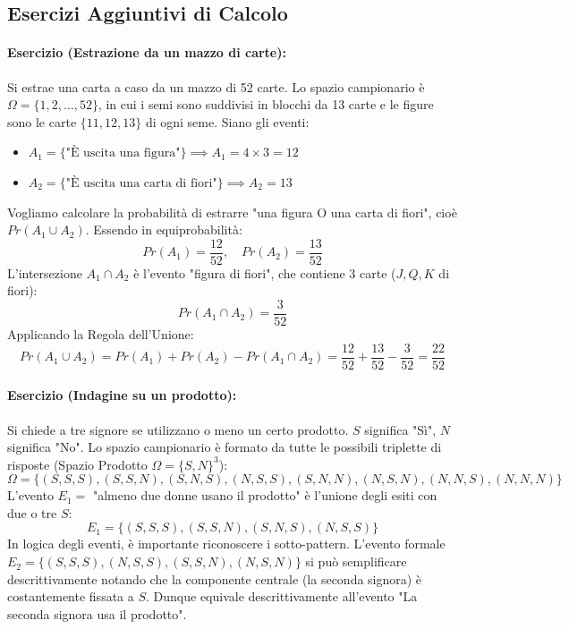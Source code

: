 \documentclass[12pt, a4paper]{article}
\begin{document}
\subsection{Esercizi Aggiuntivi di Calcolo}

\paragraph{Esercizio (Estrazione da un mazzo di carte):}
Si estrae una carta a caso da un mazzo di 52 carte. Lo spazio campionario è $\Omega = \{1, 2, \dots, 52\}$, in cui i semi sono suddivisi in blocchi da 13 carte e le figure sono le carte $\{11, 12, 13\}$ di ogni seme.
Siano gli eventi:
\begin{itemize}
    \item $A_1 = \{\text{"È uscita una figura"}\} \implies A_1 = 4 \times 3 = 12$
    \item $A_2 = \{\text{"È uscita una carta di fiori"}\} \implies A_2 = 13$
\end{itemize}
Vogliamo calcolare la probabilità di estrarre "una figura O una carta di fiori", cioè $Pr(A_1 \cup A_2)$.
Essendo in equiprobabilità:
$$ Pr(A_1) = \frac{12}{52}, \quad Pr(A_2) = \frac{13}{52} $$
L'intersezione $A_1 \cap A_2$ è l'evento "figura di fiori", che contiene 3 carte ($J, Q, K$ di fiori):
$$ Pr(A_1 \cap A_2) = \frac{3}{52} $$
Applicando la Regola dell'Unione:
$$ Pr(A_1 \cup A_2) = Pr(A_1) + Pr(A_2) - Pr(A_1 \cap A_2) = \frac{12}{52} + \frac{13}{52} - \frac{3}{52} = \frac{22}{52} $$

\paragraph{Esercizio (Indagine su un prodotto):}
Si chiede a tre signore se utilizzano o meno un certo prodotto. $S$ significa "Sì", $N$ significa "No".
Lo spazio campionario è formato da tutte le possibili triplette di risposte (Spazio Prodotto $\Omega = \{S, N\}^3$):
$$ \Omega = \{(S,S,S), (S,S,N), (S,N,S), (N,S,S), (S,N,N), (N,S,N), (N,N,S), (N,N,N)\} $$
L'evento $E_1 =$ "almeno due donne usano il prodotto" è l'unione degli esiti con due o tre $S$:
$$ E_1 = \{(S,S,S), (S,S,N), (S,N,S), (N,S,S)\} $$
In logica degli eventi, è importante riconoscere i sotto-pattern. L'evento formale $E_2 = \{(S,S,S), (N,S,S), (S,S,N), (N,S,N)\}$ si può semplificare descrittivamente notando che la componente centrale (la seconda signora) è costantemente fissata a $S$. Dunque equivale descrittivamente all'evento "La seconda signora usa il prodotto".
\end{document}

